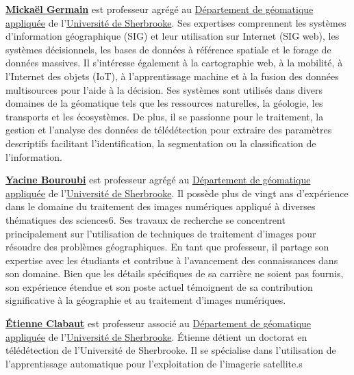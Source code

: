 \documentclass[
  french,
  11pt,
  letterpaper,
  open=any,
  twoside=false,
  french]{scrbook}
\begin{document}
\href{https://www.usherbrooke.ca/geomatique/departement/personnel/personnel-enseignant/mickael-germain}{\textbf{Mickaël
Germain}} est professeur agrégé au
\href{https://www.usherbrooke.ca/geomatique/}{Département de géomatique
appliquée} de l'\href{https://www.usherbrooke.ca/}{Université de
Sherbrooke}. Ses expertises comprennent les systèmes d'information
géographique (SIG) et leur utilisation sur Internet (SIG web), les
systèmes décisionnels, les bases de données à référence spatiale et le
forage de données massives. Il s'intéresse également à la cartographie
web, à la mobilité, à l'Internet des objets (IoT), à l'apprentissage
machine et à la fusion des données multisources pour l'aide à la
décision. Ses systèmes sont utilisés dans divers domaines de la
géomatique tels que les ressources naturelles, la géologie, les
transports et les écosystèmes. De plus, il se passionne pour le
traitement, la gestion et l'analyse des données de télédétection pour
extraire des paramètres descriptifs facilitant l'identification, la
segmentation ou la classification de l'information.

\href{https://www.usherbrooke.ca/geomatique/departement/personnel/personnel-enseignant/yacine-bouroubi}{\textbf{Yacine
Bouroubi}} est professeur agrégé au
\href{https://www.usherbrooke.ca/geomatique/}{Département de géomatique
appliquée} de l'\href{https://www.usherbrooke.ca/}{Université de
Sherbrooke}. Il possède plus de vingt ans d'expérience dans le domaine
du traitement des images numériques appliqué à diverses thématiques des
sciences6. Ses travaux de recherche se concentrent principalement sur
l'utilisation de techniques de traitement d'images pour résoudre des
problèmes géographiques. En tant que professeur, il partage son
expertise avec les étudiants et contribue à l'avancement des
connaissances dans son domaine. Bien que les détails spécifiques de sa
carrière ne soient pas fournis, son expérience étendue et son poste
actuel témoignent de sa contribution significative à la géographie et au
traitement d'images numériques.

\href{https://www.linkedin.com/in/\%C3\%A9tienne-clabaut-793a4176/?originalSubdomain=ca}{\textbf{Étienne
Clabaut}} est professeur associé au
\href{https://www.usherbrooke.ca/geomatique/}{Département de géomatique
appliquée} de l'\href{https://www.usherbrooke.ca/}{Université de
Sherbrooke}. Étienne détient un doctorat en télédétection de
l'Université de Sherbrooke. Il se spécialise dans l'utilisation de
l'apprentissage automatique pour l'exploitation de l'imagerie
satellite.s
\end{document}
